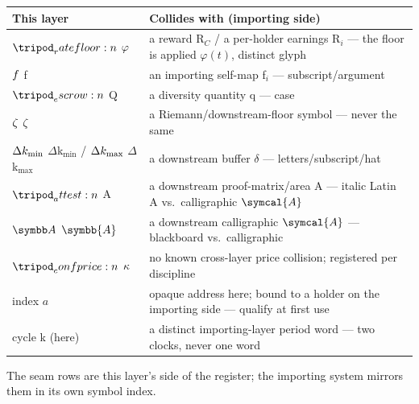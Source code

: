 \documentclass[../main.tex]{subfiles}
\begin{document}
\begin{center}
\begin{tabular}{@{}l l@{}}
    \toprule
    \textbf{This layer} & \textbf{Collides with (importing side)} \\
    \midrule
    $\ratefloor{}$ $\varphi$ & a reward R$_C$ / a per-holder earnings R$_i$ --- the floor is applied $\varphi(t)$, distinct glyph \\
    $f$ f & an importing self-map f$_i$ --- subscript/argument \\
    $\escrow{}$ Q & a diversity quantity q --- case \\
    $\zeta$ $\zeta$ & a Riemann/downstream-floor symbol --- never the same \\
    $\Delta k\sb{\min}$ $\Delta$k$_{\min}$ / $\Delta k\sb{\max}$ $\Delta$k$_{\max}$ & a downstream buffer $\delta$ --- letters/subscript/hat \\
    $\attest{}$ A & a downstream proof-matrix/area A --- italic Latin A vs.\ calligraphic $\symcal{A}$ \\
    $\addrspace$ $\symbb{A}$ & a downstream calligraphic $\symcal{A}$ --- blackboard vs.\ calligraphic \\
    $\confprice{}$ $\kappa$ & no known cross-layer price collision; registered per discipline \\
    index $a$ & opaque address here; bound to a holder on the importing side --- qualify at first use \\
    cycle k (here) & a distinct importing-layer period word --- two clocks, never one word \\
    \bottomrule
\end{tabular}
\end{center}

The seam rows are this layer's side of the register; the importing system mirrors them in
its own symbol index.

\end{document}
